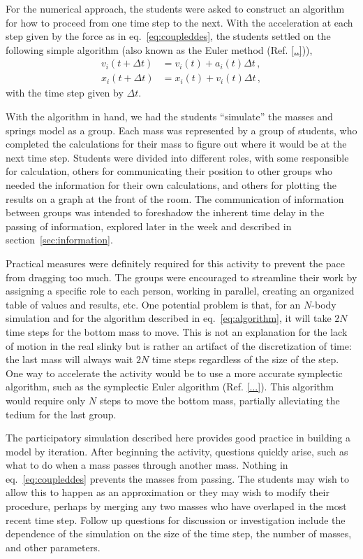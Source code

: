 \documentclass[aps,pre,10pt,superscriptaddress,showpacs,amsmath,amssymb,nofootinbib]{revtex4-1}
\newcommand{\eq}[1]{eq.~\eqref{eq:#1}}
\renewcommand{\sec}[1]{section~\ref{sec:#1}}
\newcommand{\nn}{\nonumber}
\begin{document}
For the numerical approach, the students were asked to construct an algorithm
for how to proceed from one time step to the next. With the acceleration at each
step given by the force as in \eq{coupleddes}, the students settled on the
following simple algorithm (also known as the Euler method (Ref. \ref{..})),
\begin{align} \label{eq:algorithm}
v_i(t+\Delta t) &= v_i(t) + a_i(t)\Delta t
\,,\nn\\
x_i(t+\Delta t) &= x_i(t) + v_i(t)\Delta t
\,,\end{align}
with the time step given by $\Delta t$.

With the algorithm in hand, we had the students ``simulate'' the masses and
springs model as a group. Each mass was represented by a group of 
students, who completed the calculations for their mass to figure out where it would be
at the next time step. Students were divided into different roles, with some responsible 
for calculation, others for communicating their position to other groups who 
needed the information for their own calculations, and others for plotting the results on a graph 
at the front of the room. The communication of information between groups was intended 
to foreshadow the inherent time delay in the passing of information, explored later in
the week and described in \sec{information}.

Practical measures were definitely required for this activity to prevent the pace from dragging
too much. The groups were encouraged to streamline their work by assigning a specific
role to each person, working in parallel, creating an organized table of values and results,
etc. One potential problem is that, for an $N$-body simulation and for the algorithm described in \eq{algorithm},
it will take $2N$ time steps for the bottom mass to move. This is not an explanation for
the lack of motion in the real slinky but is rather an artifact of the discretization of time:
the last mass will always wait $2N$ time steps regardless of the size of the step. One way to
accelerate the activity would be to use a more accurate symplectic algorithm, such as the
symplectic Euler algorithm (Ref. \ref{...}). This algorithm would require only $N$ steps to move the bottom
mass, partially alleviating the tedium for the last group.

The participatory simulation described here provides good practice in building
a model by iteration. After beginning the activity, questions quickly arise, such
as what to do when a mass passes through another mass. Nothing in \eq{coupleddes} prevents
the masses from passing. The students may wish to allow this to happen as an approximation
or they may wish to modify their procedure, perhaps by merging any two masses who have overlaped
in the most recent time step. Follow up questions for discussion or investigation include
the dependence of the simulation on the size of the time step, the number of masses,
and other parameters.
\end{document}
